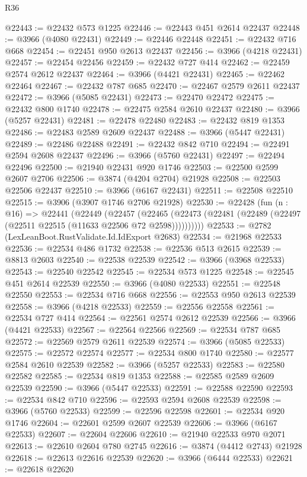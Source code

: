 \begin{lexlean}{R36}
\begin{coremodule}
@22443 := @22432 @573 @1225
@22446 := @22443 @451 @2614 @22437
@22448 := @3966 (@4080 @22431)
@22449 := @22446 @22448
@22451 := @22432 @716 @668
@22454 := @22451 @950 @2613 @22437
@22456 := @3966 (@4218 @22431)
@22457 := @22454 @22456
@22459 := @22432 @727 @414
@22462 := @22459 @2574 @2612 @22437
@22464 := @3966 (@4421 @22431)
@22465 := @22462 @22464
@22467 := @22432 @787 @685
@22470 := @22467 @2579 @2611 @22437
@22472 := @3966 (@5085 @22431)
@22473 := @22470 @22472
@22475 := @22432 @800 @1740
@22478 := @22475 @2584 @2610 @22437
@22480 := @3966 (@5257 @22431)
@22481 := @22478 @22480
@22483 := @22432 @819 @1353
@22486 := @22483 @2589 @2609 @22437
@22488 := @3966 (@5447 @22431)
@22489 := @22486 @22488
@22491 := @22432 @842 @710
@22494 := @22491 @2594 @2608 @22437
@22496 := @3966 (@5760 @22431)
@22497 := @22494 @22496
@22500 := @21940 @22431 @920 @1746
@22503 := @22500 @2599 @2607 @2706
@22506 := @3874 (@4204 @2704) @21928
@22508 := @22503 @22506 @22437
@22510 := @3966 (@6167 @22431)
@22511 := @22508 @22510
@22515 := @3906 (@3907 @1746 @2706 @21928)
@22530 := @22428
    (fun (n : @16) =>
    @22441
      (@22449
        (@22457
          (@22465 (@22473 (@22481 (@22489 (@22497 (@22511 @22515 (@11633 @22506 @72 @2598))))))))))
@22533 := @2782 (LexLeanBoot.RustValidate.Id.IdExport @2683)
@22534 := @21968 @22533
@22536 := @22534 @486 @1732
@22538 := @22536 @513 @2615
@22539 := @8813 @2603
@22540 := @22538 @22539
@22542 := @3966 (@3968 @22533)
@22543 := @22540 @22542
@22545 := @22534 @573 @1225
@22548 := @22545 @451 @2614 @22539
@22550 := @3966 (@4080 @22533)
@22551 := @22548 @22550
@22553 := @22534 @716 @668
@22556 := @22553 @950 @2613 @22539
@22558 := @3966 (@4218 @22533)
@22559 := @22556 @22558
@22561 := @22534 @727 @414
@22564 := @22561 @2574 @2612 @22539
@22566 := @3966 (@4421 @22533)
@22567 := @22564 @22566
@22569 := @22534 @787 @685
@22572 := @22569 @2579 @2611 @22539
@22574 := @3966 (@5085 @22533)
@22575 := @22572 @22574
@22577 := @22534 @800 @1740
@22580 := @22577 @2584 @2610 @22539
@22582 := @3966 (@5257 @22533)
@22583 := @22580 @22582
@22585 := @22534 @819 @1353
@22588 := @22585 @2589 @2609 @22539
@22590 := @3966 (@5447 @22533)
@22591 := @22588 @22590
@22593 := @22534 @842 @710
@22596 := @22593 @2594 @2608 @22539
@22598 := @3966 (@5760 @22533)
@22599 := @22596 @22598
@22601 := @22534 @920 @1746
@22604 := @22601 @2599 @2607 @22539
@22606 := @3966 (@6167 @22533)
@22607 := @22604 @22606
@22610 := @21940 @22533 @970 @2071
@22613 := @22610 @2604 @780 @2745
@22616 := @3874 (@4412 @2743) @21928
@22618 := @22613 @22616 @22539
@22620 := @3966 (@6444 @22533)
@22621 := @22618 @22620

\end{coremodule}
\end{lexlean}
